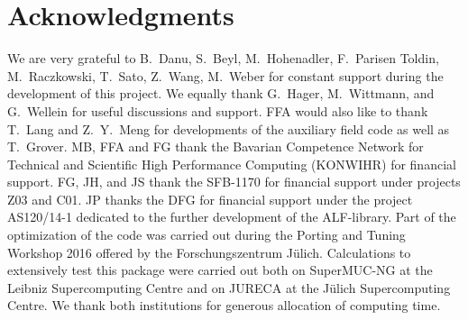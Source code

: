 

\section*{Acknowledgments} 

%

We are very grateful to  B.~Danu, S.~Beyl, M.~Hohenadler,  F.~Parisen Toldin,  M.~Raczkowski, T.~Sato, Z.~Wang,  M.~Weber   for constant support during the development of this project.
We equally thank G.~Hager, M.~Wittmann, and G.~Wellein for useful discussions and support.
FFA would also like to thank T.~Lang   and Z.~Y.~Meng for  developments of the auxiliary field code as well as T.~Grover. 
MB, FFA  and FG thank  the Bavarian Competence Network for Technical and Scientific High Performance Computing (KONWIHR) for financial support. FG, JH, and JS thank the SFB-1170 for  financial support under projects Z03 and C01.   JP  thanks the DFG for financial support under the project AS120/14-1 dedicated to the further development of the ALF-library.
Part of the optimization of the code was carried out during  the  Porting and Tuning Workshop 2016 offered by the Forschungszentrum J\"ulich.
Calculations  to extensively test this package were carried out both on  SuperMUC-NG at the  Leibniz Supercomputing Centre and on  JURECA  \cite{Jureca16} at the J\"ulich Supercomputing Centre.  We thank both institutions for generous allocation of computing time.
